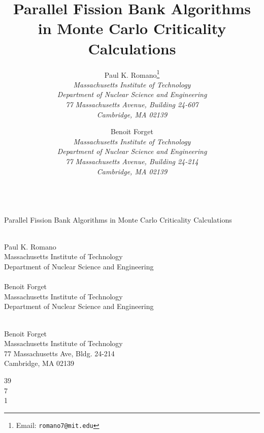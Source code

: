 \documentclass[11pt]{article}
\begin{document}
 \\ Parallel Fission Bank Algorithms in Monte
Carlo Criticality Calculations
\vspace{12pt}

 \\
Paul K. Romano \\
Massachusetts Institute of Technology \\
Department of Nuclear Science and Engineering \\
\\
Benoit Forget \\
Massachusetts Institute of Technology \\
Department of Nuclear Science and Engineering
\vspace{12pt}

 \\
Benoit Forget \\
Massachusetts Institute of Technology \\
77 Massachusetts Ave, Bldg. 24-214 \\
Cambridge, MA 02139
\vspace{12pt}

 39 \\
 7 \\
 1

\setcounter{page}{0}
\thispagestyle{empty}

\title{Parallel Fission Bank Algorithms in Monte Carlo Criticality Calculations}
\author{Paul K. Romano\footnote{Email: \texttt{romano7@mit.edu}}\\
\em Massachusetts Institute of Technology\\
\em Department of Nuclear Science and Engineering\\
\em 77 Massachusetts Avenue, Building 24-607\\
\em Cambridge, MA 02139 \\
\and Benoit Forget \\
\em Massachusetts Institute of Technology \\
\em Department of Nuclear Science and Engineering\\
\em 77 Massachusetts Avenue, Building 24-214\\
\em Cambridge, MA 02139}
\date{}
\maketitle
\end{document}
